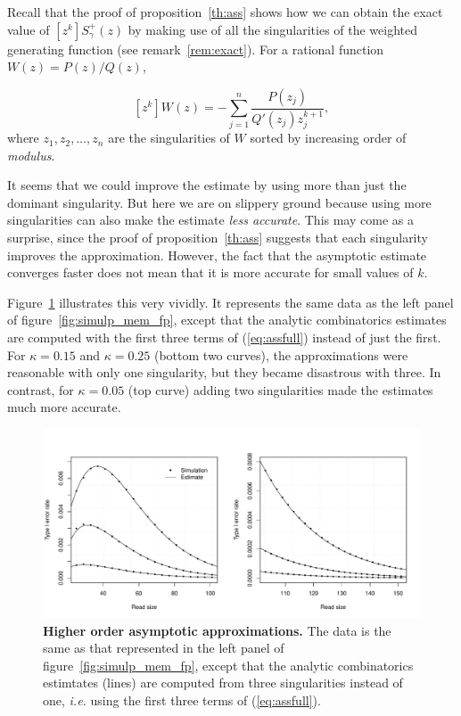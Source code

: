 \documentclass{article}
\begin{document}
Recall that the proof of proposition~\ref{th:ass} shows how we can obtain
the exact value of $[z^k]S^+_\gamma(z)$ by making use of all the
singularities of the weighted generating function (see
remark~\ref{rem:exact}). For a rational function $W(z)=P(z)/Q(z)$,

\begin{equation}
\label{eq:assfull}
[z^k]W(z) = -\sum_{j=1}^n\frac{P(z_j)}{Q'(z_j)z_j^{k+1}},
\end{equation}
where $z_1, z_2, \ldots, z_n$ are the singularities of $W$ sorted by
increasing order of \textit{modulus}.

It seems that we could improve the estimate by using more than just the
dominant singularity. But here we are on slippery ground because using
more singularities can also make the estimate \emph{less accurate}. This
may come as a surprise, since the proof of proposition~\ref{th:ass}
suggests that each singularity improves the approximation. However, the
fact that the asymptotic estimate converges faster does not mean that
it is more accurate for small values of $k$.

Figure~\ref{fig:simulp_mem_fp2} illustrates this very vividly. It
represents the same data as the left panel of
figure~\ref{fig:simulp_mem_fp}, except that the analytic combinatorics
estimates are computed with the first three terms of (\ref{eq:assfull})
instead of just the first. For $\kappa=0.15$ and $\kappa=0.25$ (bottom two
curves), the approximations were reasonable with only one singularity, but
they became disastrous with three. In contrast, for $\kappa=0.05$ (top
curve) adding two singularities made the estimates much more accurate.


\begin{figure}[h]
\centering
\includegraphics[scale=0.445]{simulp_mem_fp2.pdf}
\caption{\textbf{Higher order asymptotic approximations.}
The data is the same as that represented in the left panel of
figure~\ref{fig:simulp_mem_fp}, except that the analytic combinatorics
estimtates (lines) are computed from three singularities instead of one,
\textit{i.e.} using the first three terms of (\ref{eq:assfull}).}
\label{fig:simulp_mem_fp2}
\end{figure}
\end{document}
